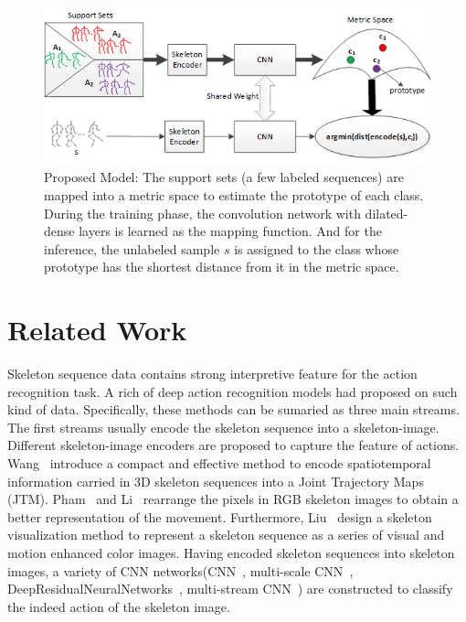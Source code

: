 \documentclass{bmvc2k}
\begin{document}
\begin{figure}[htb] 
	\centering
	\includegraphics[height=1.8in]{images/Figure_1.png}
	\caption{Proposed Model: The support sets (a few labeled sequences) are mapped into a metric space to estimate the prototype of each class. During the training phase, the convolution network with dilated-dense layers is learned as the mapping function. And for the inference, the unlabeled sample $s$ is assigned to the class whose prototype has the shortest distance from it in the metric space.}
	\label{fig:1}	
\end{figure}
\section{Related Work}

Skeleton sequence data contains strong interpretive feature for the action recognition task. A rich of deep action recognition models had proposed on such kind of data. Specifically, these methods can be sumaried as three main streams. 
The first streams usually encode the skeleton sequence into a skeleton-image. Different skeleton-image encoders are proposed to capture the feature of actions. Wang~\cite{wang2016action} introduce a compact and effective method to encode spatiotemporal information carried in 3D skeleton sequences into a Joint Trajectory Maps (JTM). Pham~\cite{pham2017learning} and Li~\cite{li2017skeleton} rearrange the pixels in RGB skeleton images to obtain a better representation of the movement. Furthermore, Liu~\cite{liu2017enhanced} design a skeleton visualization method to represent a skeleton sequence as a series of visual and motion enhanced color images. Having encoded skeleton sequences into skeleton images, a variety of CNN networks(CNN~\cite{wang2016action}, multi-scale CNN~\cite{li2017skeleton_2}, DeepResidualNeuralNetworks~\cite{pham2017learning}, multi-stream CNN~\cite{liu2017enhanced}) are constructed to classify the indeed action of the skeleton image. 
\end{document}
